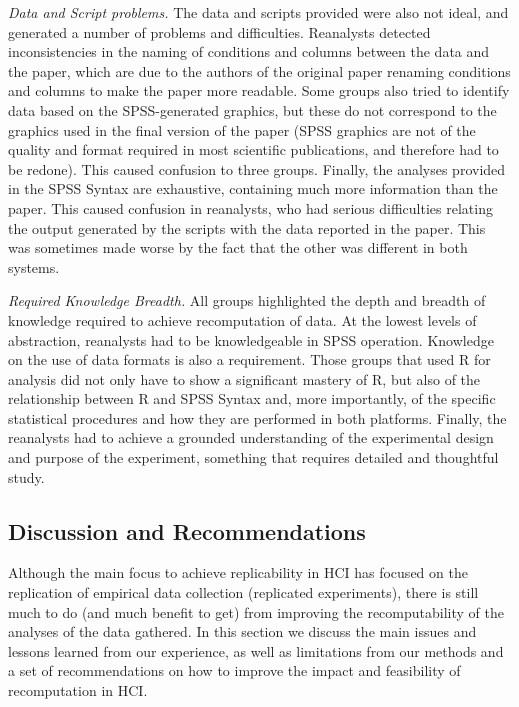 \emph{Data and Script problems.} The data and scripts provided were also not ideal, and generated a number of problems and difficulties. Reanalysts detected inconsistencies in the naming of conditions and columns between the data and the paper, which are due to the authors of the original paper renaming conditions and columns to make the paper more readable. Some groups also tried to identify data based on the SPSS-generated graphics, but these do not correspond to the graphics used in the final version of the paper (SPSS graphics are not of the quality and format required in most scientific publications, and therefore had to be redone). This caused confusion to three groups. Finally, the analyses provided in the SPSS Syntax are exhaustive, containing much more information than the paper. This caused confusion in reanalysts, who had serious difficulties relating the output generated by the scripts with the data reported in the paper. This was sometimes made worse by the fact that the other was different in both systems.

\emph{Required Knowledge Breadth.} All groups highlighted the depth and breadth of knowledge required to achieve recomputation of data. At the lowest levels of abstraction, reanalysts had to be knowledgeable in SPSS operation. Knowledge on the use of data formats is also a requirement. Those groups that used R for analysis did not only have to show a significant mastery of R, but also of the relationship between R and SPSS Syntax and, more importantly, of the specific statistical procedures and how they are performed in both platforms. Finally, the reanalysts had to achieve a grounded understanding of the experimental design and purpose of the experiment, something that requires detailed and thoughtful study.

\subsection{Discussion and Recommendations}
Although the main focus to achieve replicability in HCI has focused on the replication of empirical data collection (replicated experiments), there is still much to do (and much benefit to get) from improving the recomputability of the analyses of the data gathered. In this section we discuss the main issues and lessons learned from our experience, as well as limitations from our methods and a set of recommendations on how to improve the impact and feasibility of recomputation in HCI.

